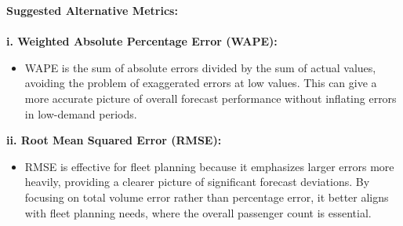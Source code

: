 \documentclass[12pt]{article}
\begin{document}
\textbf{Suggested Alternative Metrics:}\\
\\
\textbf{i. Weighted Absolute Percentage Error (WAPE):}
\begin{itemize}
    \item WAPE is the sum of absolute errors divided by the sum of actual values, avoiding the problem of exaggerated errors at low values. This can give a more accurate picture of overall forecast performance without inflating errors in low-demand periods.
\end{itemize}
\textbf{ii. Root Mean Squared Error (RMSE):}
\begin{itemize}
    \item RMSE is effective for fleet planning because it emphasizes larger errors more heavily, providing a clearer picture of significant forecast deviations. By focusing on total volume error rather than percentage error, it better aligns with fleet planning needs, where the overall passenger count is essential.
\end{itemize}
\end{document}

